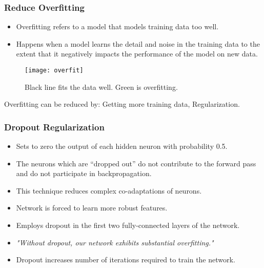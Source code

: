 \documentclass[aspectratio=169, 10pt]{beamer}
\begin{document}
\begin{frame}
	\frametitle{Reduce Overfitting}
		\begin{itemize}
			\item Overfitting refers to a model that models training data too well.
			\item Happens when a model learns the detail and noise in the training data to the extent that it negatively impacts the performance of the model on new data.
		\end{itemize}
	
	\begin{figure}
				\texttt{[image: overfit]}
				\caption{Black line fits the data well. Green is overfitting.}
			\end{figure}		
			
		Overfitting can be reduced by: Getting more training data, Regularization.

\end{frame}

\begin{frame}
	\frametitle{Dropout Regularization}
	
	\begin{itemize}
		\item Sets to zero the output of each hidden neuron with probability 0.5.
		\item  The neurons which are “dropped out” do not contribute to the forward pass and do not participate in backpropagation.
		\item This technique reduces complex co-adaptations of neurons.
		\item  Network is forced to learn more robust features.
		\item Employs dropout in the first two fully-connected layers of the network.
		\item \textit{"Without dropout, our network exhibits substantial overfitting."}
		\item Dropout increases number of iterations required to train the network.
	\end{itemize}
\end{frame}
\end{document}
